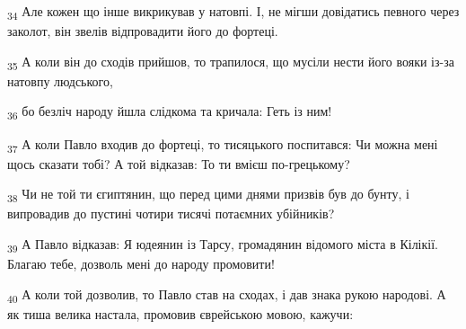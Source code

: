 \begin{tcolorbox}
\textsubscript{34} Але кожен що інше викрикував у натовпі. І, не мігши довідатись певного через заколот, він звелів відпровадити його до фортеці.
\end{tcolorbox}
\begin{tcolorbox}
\textsubscript{35} А коли він до сходів прийшов, то трапилося, що мусіли нести його вояки із-за натовпу людського,
\end{tcolorbox}
\begin{tcolorbox}
\textsubscript{36} бо безліч народу йшла слідкома та кричала: Геть із ним!
\end{tcolorbox}
\begin{tcolorbox}
\textsubscript{37} А коли Павло входив до фортеці, то тисяцького поспитався: Чи можна мені щось сказати тобі? А той відказав: То ти вмієш по-грецькому?
\end{tcolorbox}
\begin{tcolorbox}
\textsubscript{38} Чи не той ти єгиптянин, що перед цими днями призвів був до бунту, і випровадив до пустині чотири тисячі потаємних убійників?
\end{tcolorbox}
\begin{tcolorbox}
\textsubscript{39} А Павло відказав: Я юдеянин із Тарсу, громадянин відомого міста в Кілікії. Благаю тебе, дозволь мені до народу промовити!
\end{tcolorbox}
\begin{tcolorbox}
\textsubscript{40} А коли той дозволив, то Павло став на сходах, і дав знака рукою народові. А як тиша велика настала, промовив єврейською мовою, кажучи:
\end{tcolorbox}

